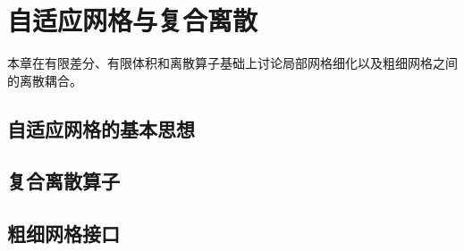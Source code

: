 \chapter{自适应网格与复合离散}
\label{ch:amr-discretization-new}

本章在有限差分、有限体积和离散算子基础上讨论局部网格细化以及粗细网格之间的离散耦合。

\section{自适应网格的基本思想}

\section{复合离散算子}

\section{粗细网格接口}
